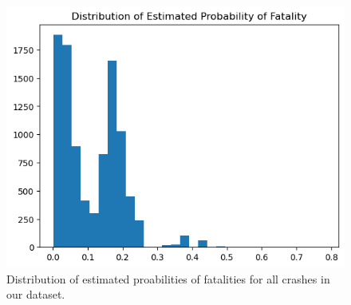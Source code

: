 \documentclass[12pt]{article}
\begin{document}
\begin{figure}[h]
    \centering
    \includegraphics[width=\textwidth]{images/prob_dist.png}
    \caption{Distribution of estimated proabilities of fatalities for all crashes in our dataset.}
    \label{fig:prob_dist}
\end{figure}



\clearpage

\printbibliography
\end{document}

